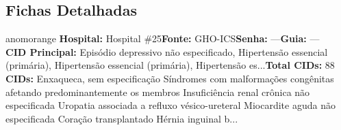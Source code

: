 \documentclass[a4paper,10pt]{article}
\begin{document}
\subsection{Fichas Detalhadas}
\begin{anomalycard}[Interna\c{c}\~{a}o \#296 | Pac. \#357 | ALTO (z=3.28) | LOS: 2d | 23/02/2026\,$\to$\,25/02/2026]{anomorange}
\textbf{Hospital:} Hospital \#25\quad \textbf{Fonte:} GHO-ICS\quad \textbf{Senha:} ---\quad \textbf{Guia:} ---\\

\textbf{CID Principal:} {\small Episódio depressivo não especificado, Hipertensão essencial (primária), Hipertensão essencial (primária), Hipertensão es...}\quad\textbf{Total CIDs:} 88\\

\textbf{CIDs:} {\scriptsize Enxaqueca, sem especificação \textbar{} Síndromes com malformações congênitas afetando predominantemente os membros \textbar{} Insuficiência renal crônica não especificada \textbar{} Uropatia associada a refluxo vésico-ureteral \textbar{} Miocardite aguda não especificada \textbar{} Coração transplantado \textbar{} Hérnia inguinal b...}\\

\end{anomalycard}
\end{document}
